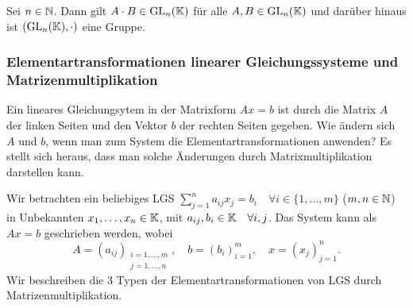 \begin{propn}
	Sei $ n\in\mathbb N $. Dann gilt $ A \cdot B \in \operatorname{GL}_n(\mathbb K) $ für alle $ A,B \in \operatorname{GL}_n(\mathbb K) $ und darüber hinaus ist $ (\operatorname{GL}_n(\mathbb K),\cdot) $ eine Gruppe.
\end{propn}

\subsubsection{Elementartransformationen linearer Gleichungssysteme und Matrizenmultiplikation}

Ein lineares Gleichungsytem in der Matrixform $A  x = b$ ist durch die Matrix $A$ der linken Seiten und den Vektor $b$ der rechten Seiten gegeben. Wie ändern sich $A$ und $b$, wenn man zum System die Elementartransformationen anwenden? Es stellt sich heraus, dass man solche Änderungen durch Matrixmultiplikation darstellen kann. 

Wir betrachten ein beliebiges LGS $ \sum_{j=1}^{n} a_{ij}x_j = b_i \quad \forall i \in\{ 1,\ldots,m \} $ ($ m,n\in\mathbb N $) in Unbekannten $ x_1,\ldots,x_n\in\mathbb K $, mit $ a_{ij},b_i\in\mathbb K \quad \forall i,j $. Das System kann als $ Ax = b $ geschrieben werden, wobei
\begin{equation*}
	A =  (a_{ij} )_{\substack{ i=1,\ldots,m \\ j =1,\ldots,n}} 
		, \quad b = {(b_i)}_{i=1}^m, \quad x = {(x_j)}_{j=1}^n.
\end{equation*}
Wir beschreiben die 3 Typen der Elementartransformationen von LGS durch Matrizenmultiplikation.


